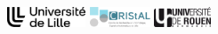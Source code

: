 \begin{frame}
    \titlepage

    \centering

    \includegraphics[height=0.6125cm]{../../assets/logos/universite-lille.logo.png}
    \hspace{1em}
    \vrule width 0.5pt
    \hspace{1em}
    \includegraphics[height=0.6125cm]{../../assets/logos/cristal-lab.logo.png}
    \hspace{1em}
    \vrule width 0.5pt
    \hspace{1em}
    \includegraphics[height=0.6125cm]{../../assets/logos/universite-rouen.logo.png} 
\end{frame}